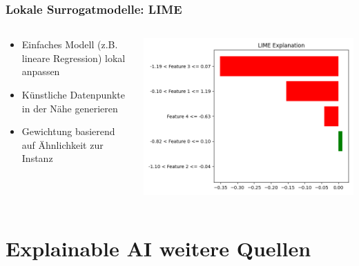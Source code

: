 \documentclass[aspectratio=1610, xcolor=dvipsnames, 9pt]{beamer}
\begin{document}
\begin{frame}
  \frametitle{Lokale Surrogatmodelle: LIME}
  \begin{columns}
    \begin{column}{0.6\textwidth}
      \begin{itemize}
        \item Einfaches Modell (z.B. lineare Regression) lokal anpassen
        \item Künstliche Datenpunkte in der Nähe generieren
        \item Gewichtung basierend auf Ähnlichkeit zur Instanz
      \end{itemize}
    \end{column}
    \begin{column}{0.4\textwidth}
      \includegraphics[width=\textwidth]{images/lime.png}
    \end{column}
  \end{columns}
\end{frame}

\section{Explainable AI weitere Quellen}
\end{document}
